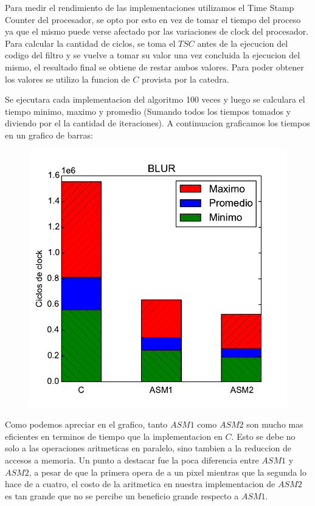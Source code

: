 Para medir el rendimiento de las implementaciones utilizamos el Time Stamp Counter del procesador, se opto por esto en vez de tomar el tiempo del proceso ya que el mismo puede verse afectado por las variaciones de clock del procesador. Para calcular la cantidad de ciclos, se toma el $TSC$ antes de la ejecucion del codigo del filtro y se vuelve a tomar su valor una vez concluida la ejecucion del mismo, el resultado final se obtiene de restar ambos valores. Para poder obtener los valores se utilizo la funcion de $C$ provista por la catedra.

Se ejecutara cada implementacion del algoritmo 100 veces y luego se calculara el tiempo minimo, maximo y promedio (Sumando todos los tiempos tomados y diviendo por el la cantidad de iteraciones). A continuacion graficamos los tiempos en un grafico de barras:

\begin{figure}[h!]
	\centering
	\includegraphics[scale=0.45]{images/blur_comparation}
\end{figure}

Como podemos apreciar en el grafico, tanto $ASM1$ como $ASM2$ son mucho mas eficientes en terminos de tiempo que la implementacion en $C$. Esto se debe no solo a las operaciones aritmeticas en paralelo, sino tambien a la reduccion de accesos a memoria. Un punto a destacar fue la poca diferencia entre $ASM1$ y $ASM2$, a pesar de que la primera opera de a un pixel mientras que la segunda lo hace de a cuatro, el costo de la aritmetica en nuestra implementacion de $ASM2$ es tan grande que no se percibe un beneficio grande respecto a $ASM1$.

